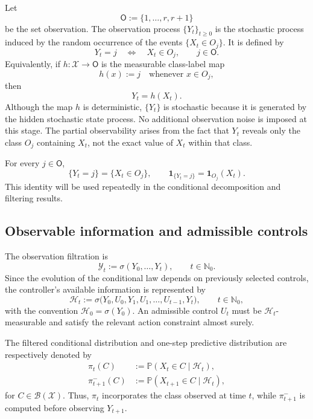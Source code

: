 \documentclass[10pt,twocolumn]{article}
\theoremstyle{remark}
\newcommand{\N}{\mathbb{N}}
\newcommand{\Pp}{\mathbb{P}}
\newcommand{\B}{\mathcal{B}}
\newcommand{\Y}{\mathcal{Y}}
\newcommand{\Hh}{\mathcal{H}}
\newcommand{\Xcal}{\mathcal{X}}
\newcommand{\one}{\mathbf{1}}
\begin{document}
Let
\[
\mathsf O:=\{1,\ldots,r, r+1\}
\]
be the set observation. The observation process $\{Y_t\}_{t\geq 0}$ is the stochastic process induced by the random occurrence of the events $\{X_t\in O_j\}$. It is defined by
\begin{equation}
Y_t=j
\quad\Longleftrightarrow\quad
X_t\in O_j,
\qquad j\in\mathsf O.
\label{eq:observation-process}
\end{equation}
Equivalently, if $h:\Xcal\to\mathsf O$ is the measurable class-label map
\[
h(x):=j
\quad\text{whenever }x\in O_j,
\]
then
\begin{equation*}
Y_t=h(X_t).
\label{eq:observation-map}
\end{equation*}
Although the map $h$ is deterministic, $\{Y_t\}$ is stochastic because it is generated by the hidden stochastic state process. No additional observation noise is imposed at this stage. The partial observability arises from the fact that $Y_t$ reveals only the class $O_j$ containing $X_t$, not the exact value of $X_t$ within that class.

For every $j\in\mathsf O$,
\begin{equation}
\{Y_t=j\}=\{X_t\in O_j\},
\qquad
\one_{\{Y_t=j\}}=\one_{O_j}(X_t).
\label{eq:event-equivalence}
\end{equation}
This identity will be used repeatedly in the conditional decomposition and filtering results.

\subsection{Observable information and admissible controls}
\label{subsec:information}

The observation filtration is
\begin{equation*}
\Y_t:=\sigma(Y_0,\ldots,Y_t),
\qquad t\in\N_0.
\label{eq:observation-filtration}
\end{equation*}
Since the evolution of the conditional law depends on previously selected controls, the controller's available information is represented by
\begin{equation*}
\Hh_t
:=
\sigma\bigl(Y_0,U_0,Y_1,U_1,\ldots,U_{t-1},Y_t\bigr),
\qquad t\in\N_0,
\label{eq:controller-filtration}
\end{equation*}
with the convention $\Hh_0=\sigma(Y_0)$. An admissible control $U_t$ must be $\Hh_t$-measurable and satisfy the relevant action constraint almost surely.

The filtered conditional distribution and one-step predictive distribution are respectively denoted by
\begin{align}
\pi_t(C)
&:=
\Pp(X_t\in C\mid\Hh_t),
\label{eq:filtered-distribution}
\\
\pi_{t+1}^{-}(C)
&:=
\Pp(X_{t+1}\in C\mid\Hh_t),
\label{eq:predictive-distribution}
\end{align}
for $C\in\B(\Xcal)$. Thus, $\pi_t$ incorporates the class observed at time $t$, while $\pi_{t+1}^{-}$ is computed before observing $Y_{t+1}$.
\end{document}
